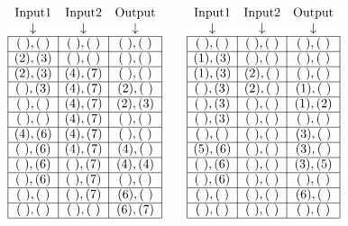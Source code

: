\documentclass{uni_tue_template}
\begin{document}
  \begin{center}
  \vspace*{-0cm}
  $\begin{array}{|c|c|c|cc|c|c|c|}
  \multicolumn{1}{c}{$Input1$}&\multicolumn{1}{c}{$Input2$}&\multicolumn{1}{c}{$Output$}&&\multicolumn{1}{c}{}&\multicolumn{1}{c}{$Input1$}&\multicolumn{1}{c}{$Input2$}&\multicolumn{1}{c}{$Output$}\\
  \multicolumn{1}{c}{\downarrow}&\multicolumn{1}{c}{\downarrow}&\multicolumn{1}{c}{\downarrow}&&\multicolumn{1}{c}{}&\multicolumn{1}{c}{\downarrow}&\multicolumn{1}{c}{\downarrow}&\multicolumn{1}{c}{\downarrow}\\
  \cline{1-3}\cline{6-8}
  (\ ),(\ )&(\ ),(\ )&(\ ),(\ )&&&(\ ),(\ )&(\ ),(\ )&(\ ),(\ )\\
    \cline{1-3}\cline{6-8}
  (2),(3)&(\ ),(\ )&(\ ),(\ )&&&(1),(3)&(\ ),(\ )&(\ ),(\ )\\
    \cline{1-3}\cline{6-8}
  (2),(3)&(4),(7)&(\ ),(\ )&&&(1),(3)&(2),(\ )&(\ ),(\ )\\
    \cline{1-3}\cline{6-8}
  (\ ),(3)&(4),(7)&(2),(\ )&&&(\ ),(3)&(2),(\ )&(1),(\ )\\
    \cline{1-3}\cline{6-8}
  (\ ),(\ )&(4),(7)&(2),(3)&&&(\ ),(3)&(\ ),(\ )&(1),(2)\\
    \cline{1-3}\cline{6-8}
  (\ ),(\ )&(4),(7)&(\ ),(\ )&&&(\ ),(3)&(\ ),(\ )&(\ ),(\ )\\
    \cline{1-3}\cline{6-8}
  (4),(6)&(4),(7)&(\ ),(\ )&&&(\ ),(\ )&(\ ),(\ )&(3),(\ )\\
    \cline{1-3}\cline{6-8}
  (\ ),(6)&(4),(7)&(4),(\ )&&&(5),(6)&(\ ),(\ )&(3),(\ )\\
    \cline{1-3}\cline{6-8}
  (\ ),(6)&(\ ),(7)&(4),(4)&&&(\ ),(6)&(\ ),(\ )&(3),(5)\\
    \cline{1-3}\cline{6-8}
  (\ ),(6)&(\ ),(7)&(\ ),(\ )&&&(\ ),(6)&(\ ),(\ )&(\ ),(\ )\\
    \cline{1-3}\cline{6-8}
  (\ ),(\ )&(\ ),(7)&(6),(\ )&&&(\ ),(\ )&(\ ),(\ )&(6),(\ )\\
    \cline{1-3}\cline{6-8}
  (\ ),(\ )&(\ ),(\ )&(6),(7)&&&(\ ),(\ )&(\ ),(\ )&(\ ),(\ )\\
    \cline{1-3}\cline{6-8}
  \end{array}$
  \end{center}
\subExEnd{}
%
\newpage 
%
\exercise{}\\
\end{document}
